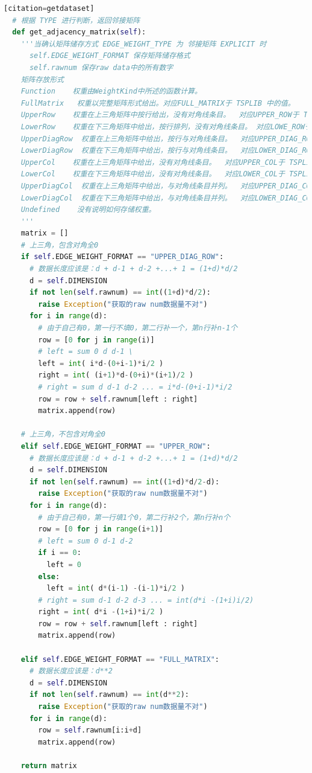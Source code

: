 \documentclass[lang=cn,11pt]{elegantpaper}
\begin{document}
\begin{lstlisting}[language=python][citation=getdataset]
  # 根据 TYPE 进行判断，返回邻接矩阵
  def get_adjacency_matrix(self):
    '''当确认矩阵储存方式 EDGE_WEIGHT_TYPE 为 邻接矩阵 EXPLICIT 时
      self.EDGE_WEIGHT_FORMAT 保存矩阵储存格式
      self.rawnum 保存raw data中的所有数字
    矩阵存放形式
    Function    权重由WeightKind中所述的函数计算。
    FullMatrix   权重以完整矩阵形式给出。对应FULL_MATRIX于 TSPLIB 中的值。
    UpperRow    权重在上三角矩阵中按行给出，没有对角线条目。  对应UPPER_ROW于 TSPLIB 中的值。
    LowerRow    权重在下三角矩阵中给出，按行排列，没有对角线条目。 对应LOWE_ROW于 TSPLIB 中的值。
    UpperDiagRow  权重在上三角矩阵中给出，按行与对角线条目。  对应UPPER_DIAG_ROW于 TSPLIB 中的值。
    LowerDiagRow  权重在下三角矩阵中给出，按行与对角线条目。  对应LOWER_DIAG_ROW于 TSPLIB 中的值。
    UpperCol    权重在上三角矩阵中给出，没有对角线条目。  对应UPPER_COL于 TSPLIB 中的值。
    LowerCol    权重在下三角矩阵中给出，没有对角线条目。  对应LOWER_COL于 TSPLIB 中的值。
    UpperDiagCol  权重在上三角矩阵中给出，与对角线条目并列。  对应UPPER_DIAG_COL于 TSPLIB 中的值。
    LowerDiagCol  权重在下三角矩阵中给出，与对角线条目并列。  对应LOWER_DIAG_COL于 TSPLIB 中的值。
    Undefined    没有说明如何存储权重。
    '''
    matrix = []
    # 上三角，包含对角全0
    if self.EDGE_WEIGHT_FORMAT == "UPPER_DIAG_ROW":
      # 数据长度应该是：d + d-1 + d-2 +...+ 1 = (1+d)*d/2
      d = self.DIMENSION
      if not len(self.rawnum) == int((1+d)*d/2):
        raise Exception("获取的raw num数据量不对")
      for i in range(d):
        # 由于自己有0，第一行不填0，第二行补一个，第n行补n-1个
        row = [0 for j in range(i)]
        # left = sum 0 d d-1 \
        left = int( i*d-(0+i-1)*i/2 )
        right = int( (i+1)*d-(0+i)*(i+1)/2 )
        # right = sum d d-1 d-2 ... = i*d-(0+i-1)*i/2
        row = row + self.rawnum[left : right]
        matrix.append(row)

    # 上三角，不包含对角全0
    elif self.EDGE_WEIGHT_FORMAT == "UPPER_ROW":
      # 数据长度应该是：d + d-1 + d-2 +...+ 1 = (1+d)*d/2
      d = self.DIMENSION
      if not len(self.rawnum) == int((1+d)*d/2-d):
        raise Exception("获取的raw num数据量不对")
      for i in range(d):
        # 由于自己有0，第一行填1个0，第二行补2个，第n行补n个
        row = [0 for j in range(i+1)]
        # left = sum 0 d-1 d-2 
        if i == 0:
          left = 0
        else:
          left = int( d*(i-1) -(i-1)*i/2 )
        # right = sum d-1 d-2 d-3 ... = int(d*i -(1+i)i/2)
        right = int( d*i -(1+i)*i/2 )
        row = row + self.rawnum[left : right]
        matrix.append(row)

    elif self.EDGE_WEIGHT_FORMAT == "FULL_MATRIX":
      # 数据长度应该是：d**2
      d = self.DIMENSION
      if not len(self.rawnum) == int(d**2):
        raise Exception("获取的raw num数据量不对")
      for i in range(d):
        row = self.rawnum[i:i+d]
        matrix.append(row)

    return matrix
\end{lstlisting}
\end{document}
